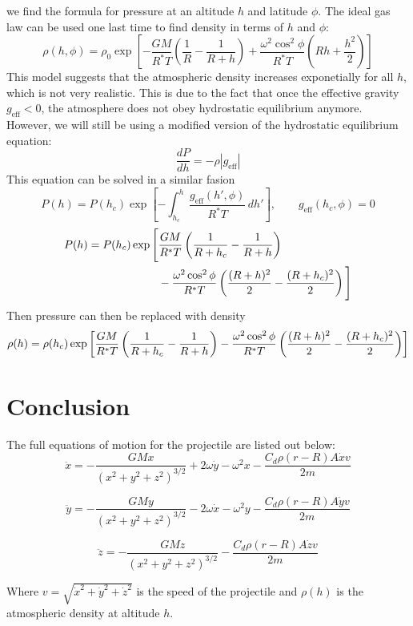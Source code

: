 \documentclass[14]{article}
\begin{document}
we find the formula for pressure at an altitude $h$ and latitude $\phi$. The ideal gas law can be used one last time to find density in terms of $h$ and $\phi$:
\begin{equation}
\rho(h, \phi) = \rho_0 \exp\left[-\frac{GM}{R^*T} \left(\frac{1}{R} - \frac{1}{R+h}\right) + \frac{\omega^2 \cos^2\phi}{R^*T} \left(Rh + \frac{h^2}{2}\right)\right]
\end{equation}
This model suggests that the atmospheric density increases exponetially for all $h$, which is not very realistic. This is due to the fact that once the effective gravity $g_{\text{eff}} < 0$, the atmosphere does not obey hydrostatic equilibrium anymore. However, we will still be using a modified version of the hydrostatic equilibrium equation:
\begin{equation}
\frac{dP}{dh} = -\rho|g_{\text{eff}}|
\end{equation}
This equation can be solved in a similar fasion
\begin{equation*}
P(h) = P(h_c) \exp\left[-\int^h_{h_c} \frac{g_{\text{eff}}(h', \phi)}{R^*T} \, dh'\right], \qquad g_{\text{eff}}(h_c, \phi) = 0
\end{equation*}
\begin{align}
P(h) = P(h_c)\exp\Bigg[& \frac{GM}{R^*T} \left(\frac{1}{R + h_c} - \frac{1}{R+h}\right) \notag \\
& - \frac{\omega^2 \cos^2\phi}{R^*T} \left(\frac{(R+h)^2}{2} - \frac{(R+h_c)^2}{2}\right) \Bigg]
\end{align}
Then pressure can then be replaced with density
\begin{equation}
\footnotesize
\rho(h) = \rho(h_c)\exp\left[\frac{GM}{R^*T} \left(\frac{1}{R + h_c} - \frac{1}{R+h}\right) - \frac{\omega^2 \cos^2\phi}{R^*T} \left(\frac{(R+h)^2}{2} - \frac{(R+h_c)^2}{2}\right)\right]
\end{equation}

\section{Conclusion}
The full equations of motion for the projectile are listed out below:
\begin{equation}
\ddot{x} = -\frac{GMx}{(x^2 + y^2 + z^2)^{3/2}} + 2\omega \dot{y} - \omega^2 x - \frac{C_d \rho(r - R) A \dot{x} v}{2m}
\end{equation}

\begin{equation}
\ddot{y} = -\frac{GMy}{(x^2 + y^2 + z^2)^{3/2}} - 2\omega \dot{x} - \omega^2 y - \frac{C_d \rho(r - R) A \dot{y} v}{2m}
\end{equation}

\begin{equation}
\ddot{z} = -\frac{GMz}{(x^2 + y^2 + z^2)^{3/2}} - \frac{C_d \rho(r - R) A \dot{z} v}{2m}
\end{equation}

Where $v = \sqrt{\dot{x}^2 + \dot{y}^2 + \dot{z}^2}$ is the speed of the projectile and
$\rho(h)$ is the atmospheric density at altitude $h$.


\nocite{*}
\printbibliography[
heading=bibintoc,
title={References}
]
\end{document}
